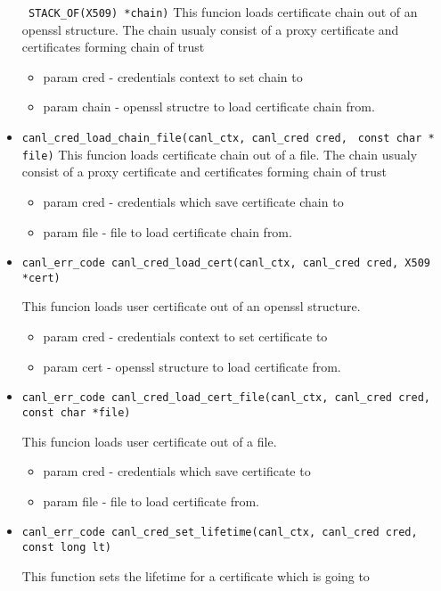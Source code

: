 \begin{itemize}
  \verb' STACK_OF(X509) *chain)'
  This funcion loads certificate chain out of an openssl structure. The 
  chain usualy 
  consist of a proxy certificate and certificates forming
  chain of trust
  \begin{itemize}
    \item param cred - credentials context to set chain to
    \item param chain - openssl structre to load certificate chain from.
  \end{itemize}
  \item \verb'canl_cred_load_chain_file(canl_ctx, canl_cred cred,'
  \verb' const char * file)'
  This funcion loads certificate chain out of a file. The chain usualy 
  consist of a proxy certificate and certificates forming
  chain of trust
  \begin{itemize}
    \item param cred - credentials which save certificate chain to
    \item param file - file to load certificate chain from.
  \end{itemize}
  \item \begin{verbatim}
canl_err_code canl_cred_load_cert(canl_ctx, canl_cred cred, X509 *cert)\end{verbatim}
  This funcion loads user certificate out of an openssl structure.
  \begin{itemize}
    \item param cred - credentials context to set certificate to 
    \item param cert - openssl structure to load certificate from.
    \end{itemize}
  \item \begin{verbatim}
canl_err_code canl_cred_load_cert_file(canl_ctx, canl_cred cred, const char *file)\end{verbatim}
  This funcion loads user certificate out of a file.
  \begin{itemize}
    \item param cred - credentials which save certificate to
    \item param file - file to load certificate from.
  \end{itemize}
  \item \begin{verbatim}
canl_err_code canl_cred_set_lifetime(canl_ctx, canl_cred cred, const long lt)\end{verbatim}
  This function sets the lifetime for a certificate which is going to 

\end{itemize}
